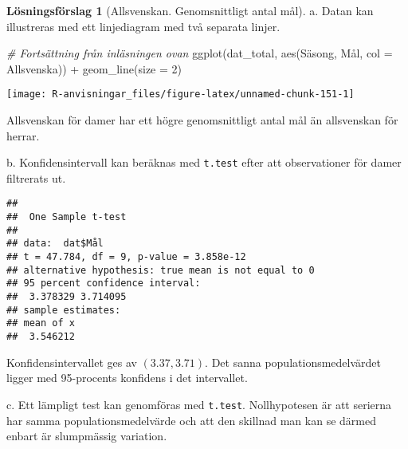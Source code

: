 \documentclass[
]{book}
\newenvironment{Shaded}{\begin{snugshade}}{\end{snugshade}}
\newcommand{\AttributeTok}[1]{\textcolor[rgb]{0.77,0.63,0.00}{#1}}
\newcommand{\CommentTok}[1]{\textcolor[rgb]{0.56,0.35,0.01}{\textit{#1}}}
\newcommand{\DecValTok}[1]{\textcolor[rgb]{0.00,0.00,0.81}{#1}}
\newcommand{\FunctionTok}[1]{\textcolor[rgb]{0.00,0.00,0.00}{#1}}
\newcommand{\NormalTok}[1]{#1}
\newcommand{\OtherTok}[1]{\textcolor[rgb]{0.56,0.35,0.01}{#1}}
\newcommand{\SpecialCharTok}[1]{\textcolor[rgb]{0.00,0.00,0.00}{#1}}
\newcommand{\StringTok}[1]{\textcolor[rgb]{0.31,0.60,0.02}{#1}}
\theoremstyle{definition}
\theoremstyle{definition}
\theoremstyle{definition}
\theoremstyle{definition}
\newtheorem{hypothesis}{Lösningsförslag}[chapter]
\theoremstyle{remark}
\begin{document}
\begin{hypothesis}[Allsvenskan. Genomsnittligt antal mål]
a. Datan kan illustreras med ett linjediagram med två separata linjer.

\begin{Shaded}
\begin{Highlighting}[]
\CommentTok{\# Fortsättning från inläsningen ovan}
\FunctionTok{ggplot}\NormalTok{(dat\_total, }\FunctionTok{aes}\NormalTok{(Säsong, Mål, }\AttributeTok{col =}\NormalTok{ Allsvenska)) }\SpecialCharTok{+}
  \FunctionTok{geom\_line}\NormalTok{(}\AttributeTok{size =} \DecValTok{2}\NormalTok{)}
\end{Highlighting}
\end{Shaded}

\begin{center}\texttt{[image: R-anvisningar\_files/figure-latex/unnamed-chunk-151-1]} \end{center}

Allsvenskan för damer har ett högre genomsnittligt antal mål än allsvenskan för herrar.

b. Konfidensintervall kan beräknas med \texttt{t.test} efter att observationer för damer filtrerats ut.

\begin{Shaded}
\end{Shaded}

\begin{verbatim}
## 
##  One Sample t-test
## 
## data:  dat$Mål
## t = 47.784, df = 9, p-value = 3.858e-12
## alternative hypothesis: true mean is not equal to 0
## 95 percent confidence interval:
##  3.378329 3.714095
## sample estimates:
## mean of x 
##  3.546212
\end{verbatim}

Konfidensintervallet ges av \((3.37, 3.71)\). Det sanna populationsmedelvärdet ligger med 95-procents konfidens i det intervallet.

c. Ett lämpligt test kan genomföras med \texttt{t.test}. Nollhypotesen är att serierna har samma populationsmedelvärde och att den skillnad man kan se därmed enbart är slumpmässig variation.


\end{hypothesis}
\end{document}
